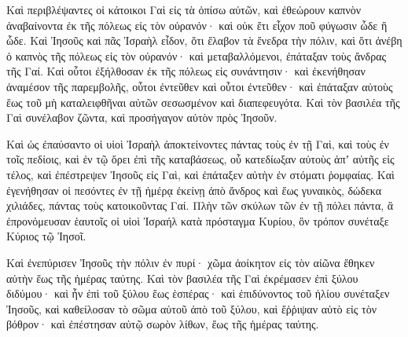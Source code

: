 {Καὶ περιβλέψαντες οἱ κάτοικοι Γαὶ εἰς τὰ ὀπίσω αὐτῶν, καὶ ἐθεώρουν καπνὸν ἀναβαίνοντα ἐκ τῆς πόλεως εἰς τὸν οὐρανόν· καὶ οὐκ ἔτι εἶχον ποῦ φύγωσιν ὧδε ἢ ὧδε.
Καὶ Ἰησοῦς καὶ πᾶς Ἰσραὴλ εἶδον, ὅτι ἔλαβον τὰ ἔνεδρα τὴν πόλιν, καὶ ὅτι ἀνέβη ὁ καπνὸς τῆς πόλεως εἰς τὸν οὐρανόν· καὶ μεταβαλλόμενοι, ἐπάταξαν τοὺς ἄνδρας τῆς Γαί.
Καὶ οὗτοι ἐξήλθοσαν ἐκ τῆς πόλεως εἰς συνάντησιν· καὶ ἐκενήθησαν ἀναμέσον τῆς παρεμβολῆς, οὗτοι ἐντεῦθεν καὶ οὗτοι ἐντεῦθεν· καὶ ἐπάταξαν αὐτοὺς ἕως τοῦ μὴ καταλειφθῆναι αὐτῶν σεσωσμένον καὶ διαπεφευγότα.
Καὶ τὸν βασιλέα τῆς Γαὶ συνέλαβον ζῶντα, καὶ προσήγαγον αὐτὸν πρὸς Ἰησοῦν.
\par }{\PP {}Καὶ ὡς ἐπαύσαντο οἱ υἱοὶ Ἰσραὴλ ἀποκτείνοντες πάντας τοὺς ἐν τῇ Γαὶ, καὶ τοὺς ἐν τοῖς πεδίοις, καὶ ἐν τῷ ὄρει ἐπὶ τῆς καταβάσεως, οὗ κατεδίωξαν αὐτοὺς ἀπʼ αὐτῆς εἰς τέλος, καὶ ἐπέστρεψεν Ἰησοῦς εἰς Γαὶ, καὶ ἐπάταξεν αὐτὴν ἐν στόματι ῥομφαίας.
Καὶ ἐγενήθησαν οἱ πεσόντες ἐν τῇ ἡμέρᾳ ἐκείνῃ ἀπὸ ἄνδρος καὶ ἕως γυναικὸς, δώδεκα χιλιάδες, πάντας τοὺς κατοικοῦντας Γαί.
Πλὴν τῶν σκύλων τῶν ἐν τῇ πόλει πάντα, ἃ ἐπρονόμευσαν ἑαυτοῖς οἱ υἱοὶ Ἰσραήλ κατὰ πρόσταγμα Κυρίου, ὃν τρόπον συνέταξε Κύριος τῷ Ἰησοῖ.
\par }{\PP {}Καὶ ἐνεπύρισεν Ἰησοῦς τὴν πόλιν ἐν πυρί· χῶμα ἀοίκητον εἰς τὸν αἰῶνα ἔθηκεν αὐτὴν ἕως τῆς ἡμέρας ταύτης.
Καὶ τὸν βασιλέα τῆς Γαὶ ἐκρέμασεν ἐπὶ ξύλου διδύμου· καὶ ἦν ἐπὶ τοῦ ξύλου ἕως ἑσπέρας· καὶ ἐπιδύνοντος τοῦ ἡλίου συνέταξεν Ἰησοῦς, καὶ καθείλοσαν τὸ σῶμα αὐτοῦ ἀπὸ τοῦ ξύλου, καὶ ἔῤῥιψαν αὐτὸ εἰς τὸν βόθρον· καὶ ἐπέστησαν αὐτῷ σωρὸν λίθων, ἕως τῆς ἡμέρας ταύτης.

}

